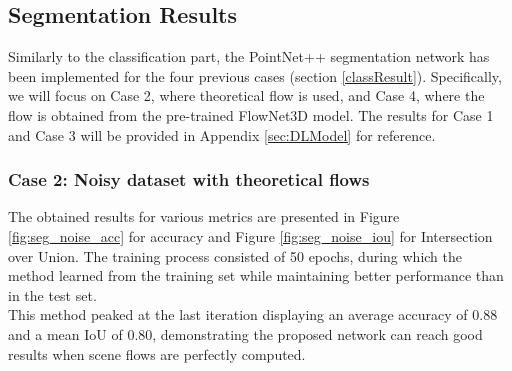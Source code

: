 \subsection{Segmentation Results}
Similarly to the classification part, the PointNet++ segmentation network has been implemented for the four previous cases (section \ref{classResult}). Specifically, we will focus on Case 2, where theoretical flow is used, and Case 4, where the flow is obtained from the pre-trained FlowNet3D model. The results for Case 1 and Case 3 will be provided in Appendix \ref{sec:DLModel} for reference.
\subsubsection{Case 2: Noisy dataset with theoretical flows}
The obtained results for various metrics are presented in Figure \ref{fig:seg_noise_acc} for accuracy and Figure \ref{fig:seg_noise_iou} for Intersection over Union. The training process consisted of 50 epochs, during which the method learned from the training set while maintaining better performance than in the test set.\\

This method peaked at the last iteration displaying an average accuracy of 0.88 and a mean IoU of 0.80, demonstrating the proposed network can reach good results when scene flows are perfectly computed.\\ 

